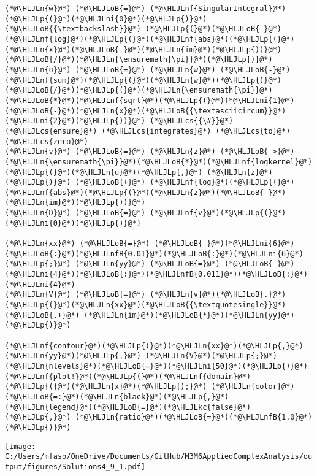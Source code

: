 \documentclass[12pt,a4paper]{article}
\newcommand{\HLJLkc}[1]{\textcolor[RGB]{59,151,46}{\textit{#1}}}
\newcommand{\HLJLn}[1]{#1}
\newcommand{\HLJLnf}[1]{\textcolor[RGB]{66,102,213}{#1}}
\newcommand{\HLJLnfB}[1]{\textcolor[RGB]{59,151,46}{#1}}
\newcommand{\HLJLni}[1]{\textcolor[RGB]{59,151,46}{#1}}
\newcommand{\HLJLoB}[1]{\textcolor[RGB]{102,102,102}{\textbf{#1}}}
\newcommand{\HLJLp}[1]{#1}
\newcommand{\HLJLcs}[1]{\textcolor[RGB]{153,153,119}{\textit{#1}}}
\begin{document}
\begin{lstlisting}
(*@\HLJLn{w}@*) (*@\HLJLoB{=}@*) (*@\HLJLnf{SingularIntegral}@*)(*@\HLJLp{(}@*)(*@\HLJLni{0}@*)(*@\HLJLp{)}@*) (*@\HLJLoB{{\textbackslash}}@*) (*@\HLJLp{(}@*)(*@\HLJLoB{-}@*)(*@\HLJLnf{log}@*)(*@\HLJLp{(}@*)(*@\HLJLnf{abs}@*)(*@\HLJLp{(}@*)(*@\HLJLn{x}@*)(*@\HLJLoB{-}@*)(*@\HLJLn{im}@*)(*@\HLJLp{))}@*)(*@\HLJLoB{/}@*)(*@\HLJLn{\ensuremath{\pi}}@*)(*@\HLJLp{)}@*)
(*@\HLJLn{u}@*) (*@\HLJLoB{=}@*) (*@\HLJLn{w}@*) (*@\HLJLoB{-}@*) (*@\HLJLnf{sum}@*)(*@\HLJLp{(}@*)(*@\HLJLn{w}@*)(*@\HLJLp{)}@*)(*@\HLJLoB{/}@*)(*@\HLJLp{(}@*)(*@\HLJLn{\ensuremath{\pi}}@*)(*@\HLJLoB{*}@*)(*@\HLJLnf{sqrt}@*)(*@\HLJLp{(}@*)(*@\HLJLni{1}@*)(*@\HLJLoB{-}@*)(*@\HLJLn{x}@*)(*@\HLJLoB{{\textasciicircum}}@*)(*@\HLJLni{2}@*)(*@\HLJLp{))}@*) (*@\HLJLcs{{\#}}@*) (*@\HLJLcs{ensure}@*) (*@\HLJLcs{integrates}@*) (*@\HLJLcs{to}@*) (*@\HLJLcs{zero}@*)
(*@\HLJLn{v}@*) (*@\HLJLoB{=}@*) (*@\HLJLn{z}@*) (*@\HLJLoB{->}@*) (*@\HLJLn{\ensuremath{\pi}}@*)(*@\HLJLoB{*}@*)(*@\HLJLnf{logkernel}@*)(*@\HLJLp{(}@*)(*@\HLJLn{u}@*)(*@\HLJLp{,}@*) (*@\HLJLn{z}@*)(*@\HLJLp{)}@*) (*@\HLJLoB{+}@*) (*@\HLJLnf{log}@*)(*@\HLJLp{(}@*)(*@\HLJLnf{abs}@*)(*@\HLJLp{(}@*)(*@\HLJLn{z}@*)(*@\HLJLoB{-}@*)(*@\HLJLn{im}@*)(*@\HLJLp{))}@*)
(*@\HLJLn{D}@*) (*@\HLJLoB{=}@*) (*@\HLJLnf{v}@*)(*@\HLJLp{(}@*)(*@\HLJLni{0}@*)(*@\HLJLp{)}@*)

(*@\HLJLn{xx}@*) (*@\HLJLoB{=}@*) (*@\HLJLoB{-}@*)(*@\HLJLni{6}@*)(*@\HLJLoB{:}@*)(*@\HLJLnfB{0.01}@*)(*@\HLJLoB{:}@*)(*@\HLJLni{6}@*)(*@\HLJLp{;}@*) (*@\HLJLn{yy}@*) (*@\HLJLoB{=}@*) (*@\HLJLoB{-}@*)(*@\HLJLni{4}@*)(*@\HLJLoB{:}@*)(*@\HLJLnfB{0.011}@*)(*@\HLJLoB{:}@*)(*@\HLJLni{4}@*)
(*@\HLJLn{V}@*) (*@\HLJLoB{=}@*) (*@\HLJLn{v}@*)(*@\HLJLoB{.}@*)(*@\HLJLp{(}@*)(*@\HLJLn{xx}@*)(*@\HLJLoB{{\textquotesingle}}@*) (*@\HLJLoB{.+}@*) (*@\HLJLn{im}@*)(*@\HLJLoB{*}@*)(*@\HLJLn{yy}@*)(*@\HLJLp{)}@*)

(*@\HLJLnf{contour}@*)(*@\HLJLp{(}@*)(*@\HLJLn{xx}@*)(*@\HLJLp{,}@*) (*@\HLJLn{yy}@*)(*@\HLJLp{,}@*) (*@\HLJLn{V}@*)(*@\HLJLp{;}@*) (*@\HLJLn{nlevels}@*)(*@\HLJLoB{=}@*)(*@\HLJLni{50}@*)(*@\HLJLp{)}@*)
(*@\HLJLnf{plot!}@*)(*@\HLJLp{(}@*)(*@\HLJLnf{domain}@*)(*@\HLJLp{(}@*)(*@\HLJLn{x}@*)(*@\HLJLp{);}@*) (*@\HLJLn{color}@*)(*@\HLJLoB{=:}@*)(*@\HLJLn{black}@*)(*@\HLJLp{,}@*) (*@\HLJLn{legend}@*)(*@\HLJLoB{=}@*)(*@\HLJLkc{false}@*)(*@\HLJLp{,}@*) (*@\HLJLn{ratio}@*)(*@\HLJLoB{=}@*)(*@\HLJLnfB{1.0}@*)(*@\HLJLp{)}@*)
\end{lstlisting}

\texttt{[image: C:/Users/mfaso/OneDrive/Documents/GitHub/M3M6AppliedComplexAnalysis/output/figures/Solutions4\_9\_1.pdf]}
\end{document}
